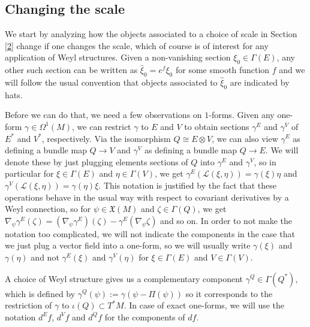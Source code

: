 \documentclass[11pt]{amsart}
\numberwithin{proposition}{section}
\numberwithin{equation}{section}
\begin{document}
\subsection{Changing the scale}\label{4.1} 
We start by analyzing how the objects associated to a choice of scale in Section \ref{2} change if one changes the scale, which of course is of interest for any application of Weyl structures. Given a non-vanishing section $\xi_0\in\Gamma(E)$, any other such section can be written as $\hat\xi_0=e^f\xi_0$ for some smooth function $f$ and we will follow the usual convention that objects associated to $\hat\xi_0$ are indicated by hats. 

Before we can do that, we need a few observations on $1$-forms. Given any one-form $\gamma\in\Omega^1(M)$, we can restrict $\gamma$ to $E$ and $V$ to obtain sections $\gamma^E$ and $\gamma^V$ of $E^*$ and $V^*$, respectively. Via the isomorphism $Q\cong E\otimes V$, we can also view $\gamma^E$ as defining a bundle map $Q\to V$ and $\gamma^V$ as defining a bundle map $Q\to E$. We will denote these by just plugging elements sections of $Q$ into $\gamma^E$ and $\gamma^V$, so in particular for $\xi\in\Gamma(E)$ and $\eta\in\Gamma(V)$, we get $\gamma^E(\mathcal L(\xi,\eta))=\gamma(\xi)\eta$ and $\gamma^V(\mathcal L(\xi,\eta))=\gamma(\eta)\xi$. This notation is justified by the fact that these operations behave in the usual way with respect to covariant derivatives by a Weyl connection, so for $\psi\in\mathfrak X(M)$ and $\zeta\in\Gamma(Q)$, we get $\nabla_\psi \gamma^E(\zeta)=(\nabla_\psi\gamma^E)(\zeta)-\gamma^E(\nabla_\psi \zeta)$ and so on. In order to not make the notation too complicated, we will not indicate the components in the case that we just plug a vector field into a one-form, so we will usually write $\gamma(\xi)$ and $\gamma(\eta)$ and not $\gamma^E(\xi)$ and $\gamma^V(\eta)$ for $\xi\in\Gamma(E)$ and $V\in\Gamma(V)$. 

A choice of Weyl structure gives us a complementary component $\gamma^Q\in\Gamma(Q^*)$, which is defined by $\gamma^Q(\psi):=\gamma(\psi-\Pi(\psi))$ so it corresponds to the restriction of $\gamma$ to $\iota(Q)\subset T^*M$. In case of exact one-forms, we will use the notation $d^Ef$, $d^Vf$ and $d^Qf$ for the components of $df$.  
\end{document}
